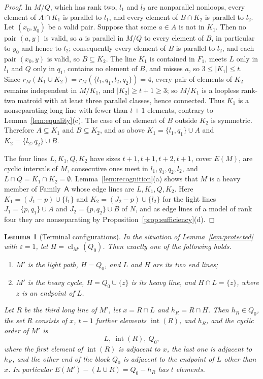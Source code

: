 \documentclass[11pt]{amsart}
\newtheorem{lemma}[theorem]{Lemma}
\theoremstyle{definition}
\theoremstyle{remark}
\numberwithin{equation}{section}
\newcommand{\cl}{\operatorname{cl}}
\newcommand{\FA}{\mathsf{A}}
\begin{document}
\begin{proof}
In $M/Q$, which has rank two, $l_1$ and $l_2$ are nonparallel nonloops, every element of $A\cap K_1$ is parallel to $l_1$, and every element of $B\cap K_2$ is parallel to $l_2$. Let $(x_0,y_0)$ be a valid pair. Suppose that some $a\in A$ is not in $K_1$. Then no pair $(a,y)$ is valid, so $a$ is parallel in $M/Q$ to every element of $B$, in particular to $y_0$ and hence to $l_2$; consequently every element of $B$ is parallel to $l_2$, and each pair $(x_0,y)$ is valid, so $B\subseteq K_2$. The line $K_1$ is contained in $F_1$, meets $L$ only in $l_1$ and $Q$ only in $q_1$, contains no element of $B$, and misses $a$, so $3\le|K_1|\le t$. Since $r_M(K_1\cup K_2)=r_M(\{l_1,q_1,l_2,q_2\})=4$, every pair of elements of $K_2$ remains independent in $M/K_1$, and $|K_2|\ge t+1\ge3$; so $M/K_1$ is a loopless rank-two matroid with at least three parallel classes, hence connected. Thus $K_1$ is a nonseparating long line with fewer than $t+1$ elements, contrary to Lemma~\ref{lem:equality}(c). The case of an element of $B$ outside $K_2$ is symmetric. Therefore $A\subseteq K_1$ and $B\subseteq K_2$, and as above $K_1=\{l_1,q_1\}\cup A$ and $K_2=\{l_2,q_2\}\cup B$.

The four lines $L,K_1,Q,K_2$ have sizes $t+1,t+1,t+2,t+1$, cover $E(M)$, are cyclic intervals of $M$, consecutive ones meet in $l_1,q_1,q_2,l_2$, and $L\cap Q=K_1\cap K_2=\emptyset$. Lemma~\ref{lem:recognition}(a) shows that $M$ is a heavy member of Family~$\FA$ whose edge lines are $L,K_1,Q,K_2$. Here $K_1=(J_1-p)\cup\{l_1\}$ and $K_2=(J_2-p)\cup\{l_2\}$ for the light lines $J_1=\{p,q_1\}\cup A$ and $J_2=\{p,q_2\}\cup B$ of $N$, and as edge lines of a model of rank four they are nonseparating by Proposition~\ref{prop:sufficiency}(d).
\end{proof}

\begin{lemma}[Terminal configurations]\label{lem:terminal}
In the situation of Lemma~\textup{\ref{lem:protected}} with $\varepsilon=1$, let $H=\cl_{M'}(Q_0)$. Then exactly one of the following holds.
\begin{enumerate}[label=\textup{(\roman*)}]
\item $M'$ is the light path, $H=Q_0$, and $L$ and $H$ are its two end lines;
\item $M'$ is the heavy cycle, $H=Q_0\cup\{z\}$ is its heavy line, and $H\cap L=\{z\}$, where $z$ is an endpoint of $L$.
\end{enumerate}
Let $R$ be the third long line of $M'$, let $x=R\cap L$ and $h_R=R\cap H$. Then $h_R\in Q_0$, the set $R$ consists of $x$, $t-1$ further elements $\operatorname{int}(R)$, and $h_R$, and the cyclic order of $M'$ is
\[
L,\ \operatorname{int}(R),\ Q_0,
\]
where the first element of $\operatorname{int}(R)$ is adjacent to $x$, the last one is adjacent to $h_R$, and the other end of the block $Q_0$ is adjacent to the endpoint of $L$ other than $x$. In particular $E(M')-(L\cup R)=Q_0-h_R$ has $t$ elements.
\end{lemma}
\end{document}
